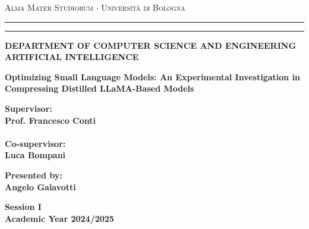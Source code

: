 \documentclass[12pt,a4paper,openright,twoside]{report}
\begin{document}
\begin{titlepage}
	\begin{center}
		{{\Large{\textsc{Alma Mater Studiorum $\cdot$ Università di
							Bologna}}}} \rule[0.1cm]{15.8cm}{0.1mm}
		\rule[0.5cm]{15.8cm}{0.6mm}
		{\small{\bf DEPARTMENT OF COMPUTER SCIENCE
		AND ENGINEERING\\
		ARTIFICIAL INTELLIGENCE }}
	\end{center}
	\vspace{15mm}
	\begin{center}
		{\LARGE{\bf Optimizing Small Language Models: An Experimental Investigation in Compressing Distilled LLaMA-Based Models}}\\
		\vspace{3mm}
	\end{center}
	\vspace{40mm}
	\par
	\noindent
	\begin{minipage}[t]{0.47\textwidth}
		{\large{\bf Supervisor:\\
				Prof. Francesco Conti\\\\
				Co-supervisor:\\
				Luca Bompani}}
	\end{minipage}
	\hfill
	\begin{minipage}[t]{0.47\textwidth}\raggedleft
		{\large{\bf Presented by:\\
				Angelo Galavotti}}
	\end{minipage}
	\vspace{20mm}
	\begin{center}
		{\large{\bf Session I\\
				Academic Year 2024/2025}}
	\end{center}
\end{titlepage}
\end{document}
